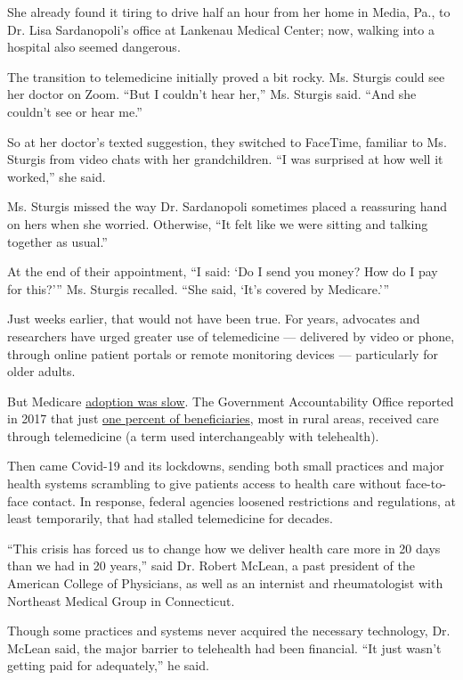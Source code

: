 She already found it tiring to drive half an hour from her home in
Media, Pa., to Dr. Lisa Sardanopoli's office at Lankenau Medical Center;
now, walking into a hospital also seemed dangerous.

The transition to telemedicine initially proved a bit rocky. Ms. Sturgis
could see her doctor on Zoom. ``But I couldn't hear her,'' Ms. Sturgis
said. ``And she couldn't see or hear me.''

So at her doctor's texted suggestion, they switched to FaceTime,
familiar to Ms. Sturgis from video chats with her grandchildren. ``I was
surprised at how well it worked,'' she said.

Ms. Sturgis missed the way Dr. Sardanopoli sometimes placed a reassuring
hand on hers when she worried. Otherwise, ``It felt like we were sitting
and talking together as usual.''

At the end of their appointment, ``I said: `Do I send you money? How do
I pay for this?''' Ms. Sturgis recalled. ``She said, `It's covered by
Medicare.'''

Just weeks earlier, that would not have been true. For years, advocates
and researchers have urged greater use of telemedicine --- delivered by
video or phone, through online patient portals or remote monitoring
devices --- particularly for older adults.

But Medicare
\href{https://www.healthaffairs.org/doi/abs/10.1377/hlthaff.2018.05151}{adoption
was slow}. The Government Accountability Office reported in 2017 that
just \href{https://www.gao.gov/products/GAO-17-365}{one percent of
beneficiaries}, most in rural areas, received care through telemedicine
(a term used interchangeably with telehealth).

Then came Covid-19 and its lockdowns, sending both small practices and
major health systems scrambling to give patients access to health care
without face-to-face contact. In response, federal agencies loosened
restrictions and regulations, at least temporarily, that had stalled
telemedicine for decades.

``This crisis has forced us to change how we deliver health care more in
20 days than we had in 20 years,'' said Dr. Robert McLean, a past
president of the American College of Physicians, as well as an internist
and rheumatologist with Northeast Medical Group in Connecticut.

Though some practices and systems never acquired the necessary
technology, Dr. McLean said, the major barrier to telehealth had been
financial. ``It just wasn't getting paid for adequately,'' he said.

